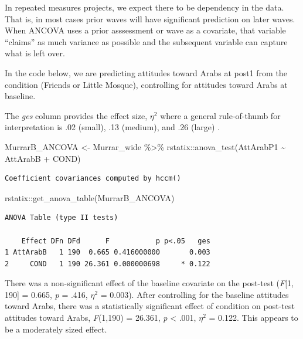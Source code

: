 \documentclass[
  11pt,
]{book}
\newenvironment{Shaded}{\begin{snugshade}}{\end{snugshade}}
\newcommand{\FunctionTok}[1]{\textcolor[rgb]{0.00,0.00,0.00}{#1}}
\newcommand{\NormalTok}[1]{#1}
\newcommand{\OtherTok}[1]{\textcolor[rgb]{0.56,0.35,0.01}{#1}}
\newcommand{\SpecialCharTok}[1]{\textcolor[rgb]{0.00,0.00,0.00}{#1}}
\begin{document}
In repeated measures projects, we expect there to be dependency in the data. That is, in most cases prior waves will have significant prediction on later waves. When ANCOVA uses a prior asssessment or wave as a covariate, that variable ``claims'' as much variance as possible and the subsequent variable can capture what is left over.

In the code below, we are predicting attitudes toward Arabs at post1 from the condition (Friends or Little Mosque), controlling for attitudes toward Arabs at baseline.

The \emph{ges} column provides the effect size, \(\eta^2\) where a general rule-of-thumb for interpretation is .02 (small), .13 (medium), and .26 (large) \citep{lakens_calculating_2013}.

\begin{Shaded}
\begin{Highlighting}[]
\NormalTok{MurrarB\_ANCOVA }\OtherTok{\textless{}{-}}\NormalTok{ Murrar\_wide }\SpecialCharTok{\%\textgreater{}\%}
\NormalTok{    rstatix}\SpecialCharTok{::}\FunctionTok{anova\_test}\NormalTok{(AttArabP1 }\SpecialCharTok{\textasciitilde{}}\NormalTok{ AttArabB }\SpecialCharTok{+}\NormalTok{ COND)}
\end{Highlighting}
\end{Shaded}

\begin{verbatim}
Coefficient covariances computed by hccm()
\end{verbatim}

\begin{Shaded}
\begin{Highlighting}[]
\NormalTok{rstatix}\SpecialCharTok{::}\FunctionTok{get\_anova\_table}\NormalTok{(MurrarB\_ANCOVA)}
\end{Highlighting}
\end{Shaded}

\begin{verbatim}
ANOVA Table (type II tests)

    Effect DFn DFd      F           p p<.05   ges
1 AttArabB   1 190  0.665 0.416000000       0.003
2     COND   1 190 26.361 0.000000698     * 0.122
\end{verbatim}

There was a non-significant effect of the baseline covariate on the post-test (\emph{F}{[}1, 190{]} = 0.665, \emph{p} = .416, \(\eta^2\) = 0.003). After controlling for the baseline attitudes toward Arabs, there was a statistically significant effect of condition on post-test attitudes toward Arabs, \emph{F}(1,190) = 26.361, \emph{p} \textless{} .001, \(\eta^2\) = 0.122. This appears to be a moderately sized effect.
\end{document}
